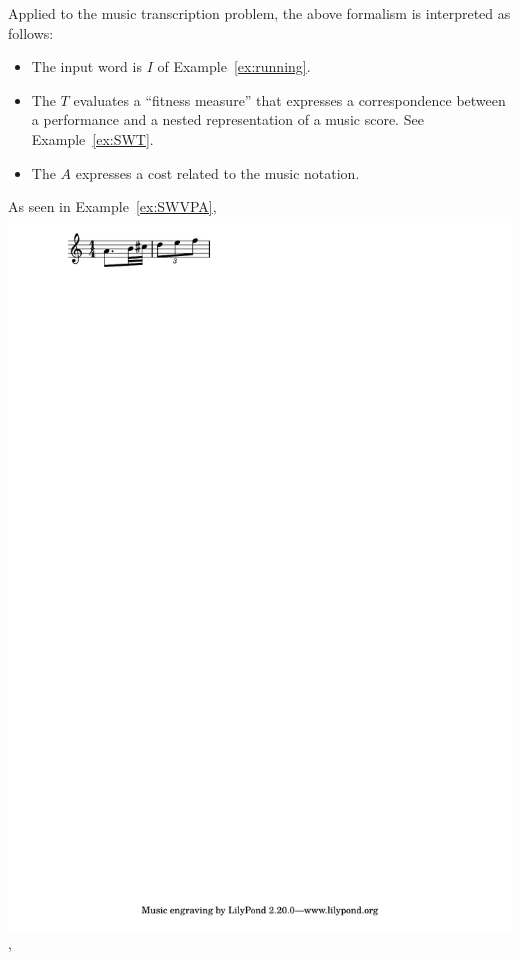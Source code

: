 \begin{example}
Applied to the music transcription problem, the above formalism
is interpreted as follows:
%
\begin{itemize}
\item The input word is $I$ of Example~\ref{ex:running}.
\item The \SWT $T$ evaluates a ``fitness measure''  that expresses
    a correspondence between a performance and a nested representation of a music score.
    See Example~\ref{ex:SWT}.
\item The \SWVPA $A$ expresses a cost related to the music notation.
\end{itemize}
%
As seen in Example~\ref{ex:SWVPA},
\includegraphics[scale=0.35,trim=0 5mm 0 0]{pictures/ex1.pdf},

\end{example}

